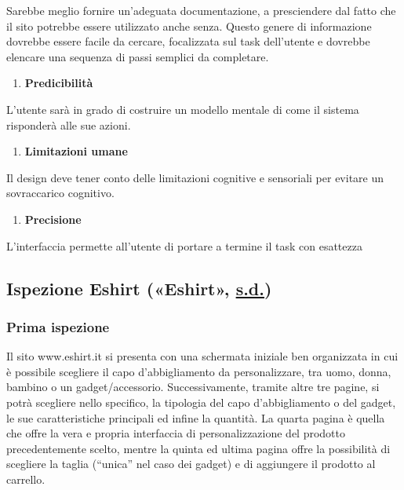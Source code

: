 \documentclass[12pt,italian,]{report}
\providecommand{\tightlist}{%
  \setlength{\itemsep}{0pt}\setlength{\parskip}{0pt}}
\begin{document}
Sarebbe meglio fornire un'adeguata documentazione, a presciendere dal
fatto che il sito potrebbe essere utilizzato anche senza. Questo genere
di informazione dovrebbe essere facile da cercare, focalizzata sul task
dell'utente e dovrebbe elencare una sequenza di passi semplici da
completare.

\begin{enumerate}
\def\labelenumi{\arabic{enumi}.}
\setcounter{enumi}{10}
\tightlist
\item
  \textbf{Predicibilità}
\end{enumerate}

L'utente sarà in grado di costruire un modello mentale di come il
sistema risponderà alle sue azioni.

\begin{enumerate}
\def\labelenumi{\arabic{enumi}.}
\setcounter{enumi}{11}
\tightlist
\item
  \textbf{Limitazioni umane}
\end{enumerate}

Il design deve tener conto delle limitazioni cognitive e sensoriali per
evitare un sovraccarico cognitivo.

\begin{enumerate}
\def\labelenumi{\arabic{enumi}.}
\setcounter{enumi}{12}
\tightlist
\item
  \textbf{Precisione}
\end{enumerate}

L'interfaccia permette all'utente di portare a termine il task con
esattezza

\hypertarget{ispezione-eshirt-eshirt}{%
\subsection{\texorpdfstring{Ispezione Eshirt («Eshirt»,
\protect\hyperlink{ref-eshirt}{s.d.})}{Ispezione Eshirt («Eshirt», s.d.)}}\label{ispezione-eshirt-eshirt}}

\hypertarget{prima-ispezione}{%
\subsubsection{Prima ispezione}\label{prima-ispezione}}

Il sito www.eshirt.it si presenta con una schermata iniziale ben
organizzata in cui è possibile scegliere il capo d'abbigliamento da
personalizzare, tra uomo, donna, bambino o un gadget/accessorio.
Successivamente, tramite altre tre pagine, si potrà scegliere nello
specifico, la tipologia del capo d'abbigliamento o del gadget, le sue
caratteristiche principali ed infine la quantità. La quarta pagina è
quella che offre la vera e propria interfaccia di personalizzazione del
prodotto precedentemente scelto, mentre la quinta ed ultima pagina offre
la possibilità di scegliere la taglia (``unica'' nel caso dei gadget) e
di aggiungere il prodotto al carrello.
\end{document}
